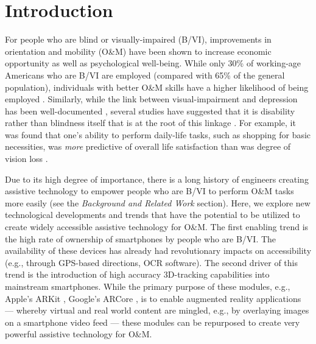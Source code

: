 \documentclass[chi_draft]{sigchi}
\newcommand{\BVI}{B/VI\xspace}
\newcommand{\OM}{O\&M\xspace}
\begin{document}
\section{Introduction}
For people who are blind or visually-impaired (\BVI), improvements in orientation and mobility (\OM) have been shown to increase economic opportunity as well as psychological well-being.  While only 30\% of working-age Americans who are \BVI are employed \cite{employmentstatistics2017, kirchner1999looking} (compared with 65\% of the general population), individuals with better \OM skills have a higher likelihood of being employed \cite{crudden1998comprehensive, crudden1999barriers, leonard1999factors, o1999employment}.   Similarly, while the link between visual-impairment and depression has been well-documented \cite{rubin1994visual, rovner1996depression, hayman2007depression, heyl2001psychosocial}, several studies have suggested that it is disability rather than blindness itself that is at the root of this linkage \cite{rovner1996depression, williams1998psychosocial}.  For example, it was found that one's ability to perform daily-life tasks, such as shopping for basic necessities, was \emph{more} predictive of overall life satisfaction than was degree of vision loss \cite{williams1998psychosocial}.

Due to its high degree of importance, there is a long history of engineers creating assistive technology to empower people who are \BVI to perform \OM tasks more easily (see the \emph{Background and Related Work} section).  Here, we explore new technological developments and trends that have the potential to be utilized to create widely accessible assistive technology for \OM.  The first enabling trend is the high rate of ownership of smartphones by people who are \BVI \cite{morris2014blind}.  The availability of these devices has already had revolutionary impacts on accessibility (e.g., through GPS-based directions, OCR software).  The second driver of this trend is the introduction of high accuracy 3D-tracking capabilities into mainstream smartphones.  While the primary purpose of these modules, e.g., Apple's ARKit \cite{arkit}, Google's ARCore \cite{arcore}, is to enable augmented reality applications --- whereby virtual and real world content are mingled, e.g., by overlaying images on a smartphone video feed --- these modules can be repurposed to create very powerful assistive technology for \OM.
\end{document}
